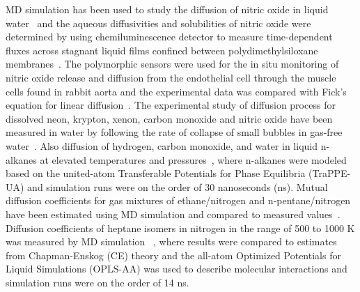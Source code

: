 MD simulation has been used to study the diffusion of nitric oxide in liquid water~\citep{zhou2005molecular} and  the aqueous  diffusivities and solubilities of nitric oxide were determined by using chemiluminescence detector to measure time-dependent fluxes across stagnant liquid films confined between  polydimethylsiloxane membranes~\citep{zacharia2005diffusivity}. The polymorphic sensors were used for the in situ monitoring of nitric oxide release and diffusion from the endothelial cell through the muscle cells found in rabbit aorta and the experimental data was compared with Fick's equation for linear diffusion~\citep{malinski1993diffusion}. The experimental
study of diffusion process for dissolved neon, krypton, xenon, carbon monoxide and nitric oxide have been measured in water by following the rate of collapse of small bubbles in gas-free water~\citep{wise1968diffusion}. Also diffusion of hydrogen, carbon monoxide, and water in liquid n-alkanes at elevated temperatures and pressures~\citep{makrodimitri2011molecular}, where n-alkanes were modeled based on the united-atom Transferable Potentials for Phase Equilibria (TraPPE-UA) and simulation runs were on the order of 30 nanoseconds (ns). Mutual diffusion coefficients for gas mixtures of ethane/nitrogen and n-pentane/nitrogen have been estimated using MD simulation and compared to measured values~\citep{chae2011mutual}. Diffusion coefficients of heptane isomers in nitrogen in the range of 500 to 1000 K was measured by MD simulation ~\citep{chae2011mutual}, where results were compared to estimates from Chapman-Enskog (CE) theory and the all-atom Optimized Potentials for Liquid Simulations (OPLS-AA)
was used to describe molecular interactions and simulation runs were on the order of
14 ns.

